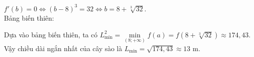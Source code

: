 \begin{bt}
{\begin{eqnarray*}
		\end{eqnarray*}
		$f'(b) = 0 \Leftrightarrow (b-8)^3 = 32  \Leftrightarrow b = 8+\sqrt[3]{32}$.\\
		 Bảng biến thiên:
		\begin{center}
		\end{center}
		Dựa vào bảng biến thiên, ta có $L^2_{\min} = \min\limits_{(8;+\infty)} f(a)  = f\left(8+\sqrt[3]{32}\right) \approx 174{,}43$.\\
	Vậy  chiều dài ngắn nhất của cây sào là $L_{\min} = \sqrt{174{,}43} \approx 13$ m.}
\end{bt}

